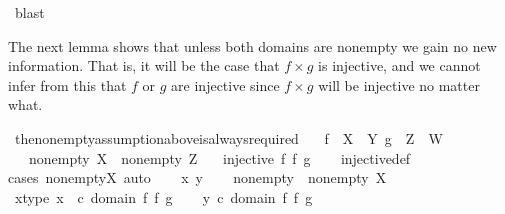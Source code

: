 \begin{isabellebody}
\ blast\isanewline
\ \ \isamarkupfalse%
\isanewline
{}\isamarkupfalse%
%
\endisatagproof
{\isafoldproof}%
%
\isadelimproof
%
\endisadelimproof
%
\begin{isamarkuptext}%
The next lemma shows that unless both domains are nonempty we gain no new information. 
That is, it will be the case that $f \times g$ is injective, and we cannot infer from this that $f$ or $g$ are
injective since $f \times g$ will be injective no matter what.%
\end{isamarkuptext}\isamarkuptrue%
\isamarkupfalse%
\ the{\isacharunderscore}{\kern0pt}nonempty{\isacharunderscore}{\kern0pt}assumption{\isacharunderscore}{\kern0pt}above{\isacharunderscore}{\kern0pt}is{\isacharunderscore}{\kern0pt}always{\isacharunderscore}{\kern0pt}required{\isacharcolon}{\kern0pt}\isanewline
\ \ \ {\isachardoublequoteopen}f\ {\isacharcolon}{\kern0pt}\ X\ {\isasymrightarrow}\ Y{\isachardoublequoteclose}\ {\isachardoublequoteopen}g\ {\isacharcolon}{\kern0pt}\ Z\ {\isasymrightarrow}\ W{\isachardoublequoteclose}\isanewline
\ \ \ {\isachardoublequoteopen}{\isasymnot}{\isacharparenleft}{\kern0pt}nonempty\ X{\isacharparenright}{\kern0pt}\ {\isasymor}\ {\isasymnot}{\isacharparenleft}{\kern0pt}nonempty\ Z{\isacharparenright}{\kern0pt}{\isachardoublequoteclose}\isanewline
\ \ \ {\isachardoublequoteopen}injective\ {\isacharparenleft}{\kern0pt}f\ {\isasymtimes}\isactrlsub f\ g{\isacharparenright}{\kern0pt}{\isachardoublequoteclose}\isanewline
%
\isadelimproof
\ \ %
\endisadelimproof
%
\isatagproof
{}\isamarkupfalse%
\ injective{\isacharunderscore}{\kern0pt}def\ \isanewline
{}\isamarkupfalse%
{\isacharparenleft}{\kern0pt}cases\ {\isachardoublequoteopen}nonempty{\isacharparenleft}{\kern0pt}X{\isacharparenright}{\kern0pt}{\isachardoublequoteclose}{\isacharcomma}{\kern0pt}\ auto{\isacharparenright}{\kern0pt}\isanewline
\ \ \isamarkupfalse%
\ x\ y\isanewline
\ \ \isamarkupfalse%
\ nonempty{\isacharcolon}{\kern0pt}\ \ {\isachardoublequoteopen}nonempty\ X{\isachardoublequoteclose}\isanewline
\ \ \isamarkupfalse%
\ x{\isacharunderscore}{\kern0pt}type{\isacharcolon}{\kern0pt}\ {\isachardoublequoteopen}x\ \ {\isasymin}\isactrlsub c\ domain\ {\isacharparenleft}{\kern0pt}f\ {\isasymtimes}\isactrlsub f\ g{\isacharparenright}{\kern0pt}{\isachardoublequoteclose}\isanewline
\ \ \isamarkupfalse%
\ {\isachardoublequoteopen}y\ {\isasymin}\isactrlsub c\ domain\ {\isacharparenleft}{\kern0pt}f\ {\isasymtimes}\isactrlsub f\ g{\isacharparenright}{\kern0pt}{\isachardoublequoteclose}\isanewline

\end{isabellebody}
